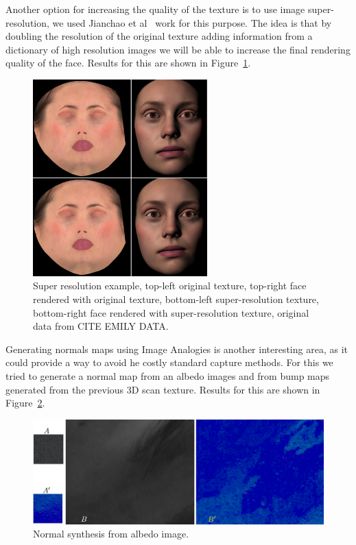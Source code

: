 \documentclass[11pt]{report}
\begin{document}
Another option for increasing the quality of the texture is to use image super-resolution, we used Jianchao et al~\cite{Jianchao2010} work for this purpose.
The idea is that by doubling the resolution of the original texture adding information from a dictionary of high resolution images we will be able to increase the final rendering quality of the face.
Results for this are shown in Figure~\ref{fig:emily_super_resolution}.

\begin{figure}[htbp!]
\centering
\includegraphics[width=0.6\textwidth]{img/emily_super_resolution}
	\caption{ Super resolution example, top-left original texture, top-right face rendered with original texture, bottom-left super-resolution texture, bottom-right face rendered with super-resolution texture, original data from CITE EMILY DATA.}
	\label{fig:emily_super_resolution}
\end{figure}

Generating normals maps using Image Analogies is another interesting area, as it could provide a way to avoid he costly standard capture methods.
For this we tried to generate a normal map from an albedo images and from bump maps generated from the previous 3D scan texture.
Results for this are shown in Figure~\ref{fig:normal_synthesis}.

\begin{figure}[htbp!]
\centering
\includegraphics[width=\textwidth]{img/normal_generation}
	\caption{ Normal synthesis from albedo image.}
	\label{fig:normal_synthesis}
\end{figure}
\end{document}
